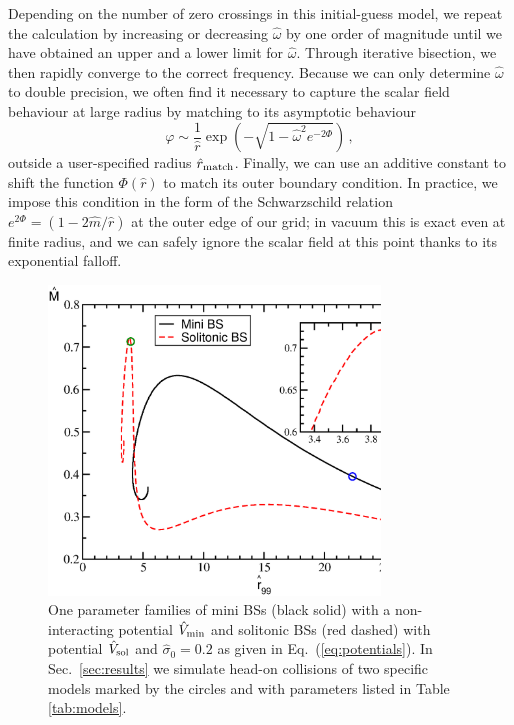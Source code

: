 \documentclass[]{iopart}
\begin{document}
Depending on the number of zero crossings in this initial-guess
model, we repeat the calculation by increasing or decreasing
$\hat{\omega}$ by one order of magnitude until we have obtained an
upper and a lower limit for $\hat{\omega}$. Through iterative
bisection, we then rapidly converge to the correct frequency. Because
we can only determine $\hat{\omega}$ to double precision, we often
find it necessary to capture the scalar field behaviour at large
radius by matching to its asymptotic behaviour
%
\begin{equation}
  \varphi \sim \frac{1}{\hat{r}}
  \exp\left( {-\sqrt{1-\hat{\omega}^2e^{-2\Phi}}}\right)\,,
\end{equation}
%
outside a user-specified radius $\hat{r}_{\rm match}$. Finally, we
can use an additive constant to shift the function $\Phi(\hat{r})$
to match its outer boundary condition. In practice, we impose this
condition in the form of the Schwarzschild relation
$e^{2\Phi}=(1-2\hat{m}/\hat{r})$ at the outer edge of our grid; in
vacuum this is exact even at finite radius, and we can safely ignore
the scalar field at this point thanks to its exponential falloff.
%
\begin{figure}[b]
    \centering
    \includegraphics[width=250pt]{statBS.eps}
    \caption{One parameter families of mini BSs (black solid) with
    a non-interacting potential $\hat{V}_{\rm min}$ and solitonic
    BSs (red dashed) with potential $\hat{V}_{\rm sol}$ and
    $\hat{\sigma}_0=0.2$ as given in Eq.~(\ref{eq:potentials}). In
    Sec.~\ref{sec:results} we simulate head-on collisions of two
    specific models marked by the circles and with parameters listed
    in Table \ref{tab:models}.
    }
    \label{fig:statBS}
\end{figure}
%
\end{document}
